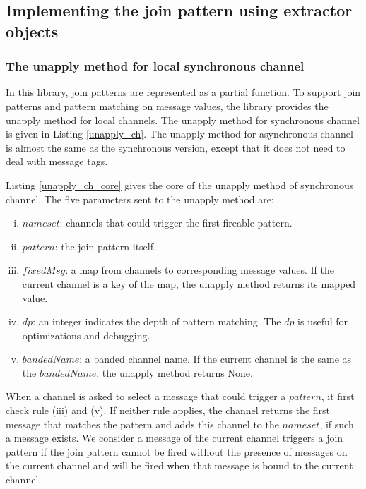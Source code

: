 \subsection{Implementing the join pattern using extractor objects}

\subsubsection{The unapply method for local synchronous channel}

In this library, join patterns are represented as a partial function.  To support join patterns and pattern matching on message values, the library provides the unapply method for local channels.  The unapply method for synchronous channel is given in Listing \ref{unapply_ch}.    The unapply method for asynchronous channel is almost the same as the synchronous version, except that it does not need to deal with message tags.

Listing \ref{unapply_ch_core} gives the core of the unapply method of synchronous channel.  The five parameters sent to the unapply method are:

\begin{enumerate} [(i)]
  \item $nameset$: channels that could trigger the first fireable pattern.
  \item $pattern$: the join pattern itself.
  \item $fixedMsg$: a map from channels to corresponding message values.  If the current channel is a key of the map, the unapply method returns its mapped value.
  \item $dp$: an integer indicates the depth of pattern matching.  The $dp$ is useful for optimizations and debugging.
  \item $bandedName$: a banded channel name.  If the current channel is the same as the $bandedName$, the unapply method returns None.
\end{enumerate}

When a channel is asked to select a message that could trigger a $pattern$, it first check rule (iii) and (v).  If neither rule applies, the channel returns the first message that matches the pattern and adds this channel to the $nameset$, if such a message exists.  We consider a message of the current channel triggers a join pattern if the join pattern cannot be fired without the presence of messages on the current channel and will be fired when that message is bound to the current channel.

